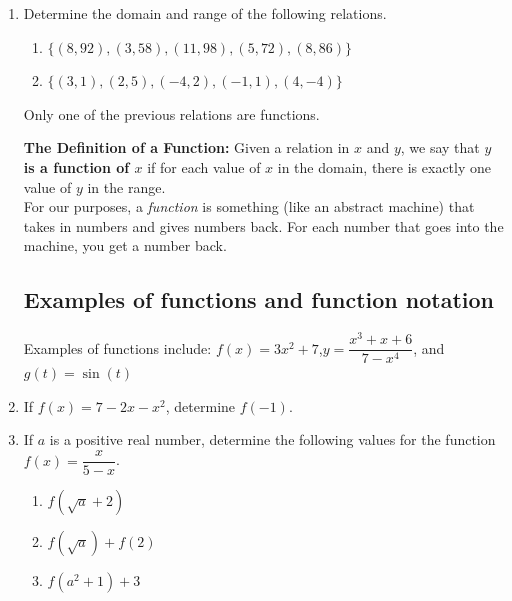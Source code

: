 \begin{enumerate}
\item Determine the domain and range of the following relations.
\begin{enumerate}
\item $\{(8,92), (3,58), (11,98), (5,72), (8,86) \}$\\[1in]
\item $\{(3,1), (2,5), (-4,2), (-1,1), (4,-4) \}$\\[1in]
\end{enumerate}
\vfill
Only one of the previous relations are functions.\\

\newpage

\noindent \textbf{The Definition of a Function:}  Given a relation in $x$ and $y$, we say that \textbf{$y$ is a function of $x$} if for each value of $x$ in the domain, there is exactly one value of $y$ in the range.\\

For our purposes, a \emph{function} is something (like an abstract machine) that takes in numbers and gives numbers back.  For each number that goes into the machine, you get a number back.



 \subsection{Examples of functions and function notation}
Examples of functions include: $f(x) = 3x^2 +7$,\quad  $y = \dfrac{x^3+x+6}{7-x^4}$, and $g(t) = \sin(t)$\\[.5in]




\item If $f(x)= 7 - 2x - x^2$, determine $f(-1)$. \\[.5in]

\item If $a$ is a positive real number, determine the following values for the function $f(x) = \dfrac{x}{5-x}$.

\begin{enumerate}

\item $f(\sqrt{a}+2)$ \\[.5in]

\item $f(\sqrt{a})+f(2)$ \\[.5in]


\item $f(a^2+1)+3$ \\[.5in]
\end{enumerate}





\end{enumerate}
